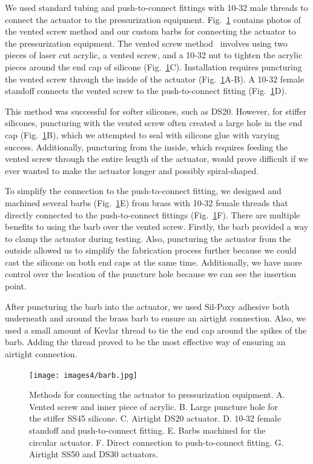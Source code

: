 We used standard tubing and push-to-connect fittings with 10-32 male threads to connect the actuator to the pressurization equipment. Fig.~\ref{fig:barb} contains photos of the vented screw method and our custom barbs for connecting the actuator to the pressurization equipment. The vented screw method~\cite{polygerinos_modeling_2015} involves using two pieces of laser cut acrylic, a vented screw, and a 10-32 nut to tighten the acrylic pieces around the end cap of silicone (Fig.~\ref{fig:barb}C). Installation requires puncturing the vented screw through the inside of the actuator (Fig.~\ref{fig:barb}A-B). A 10-32 female standoff connects the vented screw to the push-to-connect fitting (Fig.~\ref{fig:barb}D). 

This method was successful for softer silicones, such as DS20. However, for stiffer silicones, puncturing with the vented screw often created a large hole in the end cap (Fig.~\ref{fig:barb}B), which we attempted to seal with silicone glue with varying success. Additionally, puncturing from the inside, which requires feeding the vented screw through the entire length of the actuator, would prove difficult if we ever wanted to make the actuator longer and possibly spiral-shaped. 

To simplify the connection to the push-to-connect fitting, we designed and machined several barbs (Fig.~\ref{fig:barb}E) from brass with 10-32 female threads that directly connected to the push-to-connect fittings (Fig.~\ref{fig:barb}F). There are multiple benefits to using the barb over the vented screw. Firstly, the barb provided a way to clamp the actuator during testing. Also, puncturing the actuator from the outside allowed us to simplify the fabrication process further because we could cast the silicone on both end caps at the same time. Additionally, we have more control over the location of the puncture hole because we can see the insertion point. 

After puncturing the barb into the actuator, we used Sil-Poxy adhesive both underneath and around the brass barb to ensure an airtight connection. Also, we used a small amount of Kevlar thread to tie the end cap around the spikes of the barb. Adding the thread proved to be the most effective way of ensuring an airtight connection. \\

\begin{figure}[ht!]
    \centering
    \texttt{[image: images4/barb.jpg]}
    \caption{Methods for connecting the actuator to pressurization equipment. A. Vented screw and inner piece of acrylic. B. Large puncture hole for the stiffer SS45 silicone. C. Airtight DS20 actuator. D. 10-32 female standoff and push-to-connect fitting. E. Barbs machined for the circular actuator. F. Direct connection to push-to-connect fitting. G. Airtight SS50 and DS30 actuators. }
    \label{fig:barb}
\end{figure}